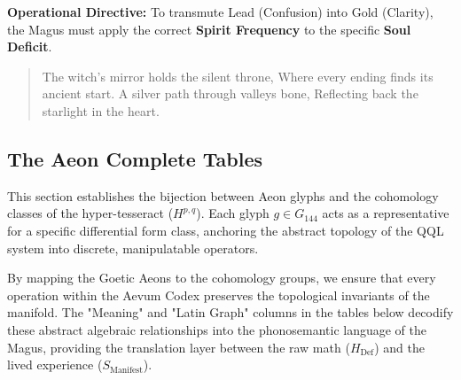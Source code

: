 \documentclass[12pt]{amsart}
\begin{document}
\vspace{1em}
\noindent \textbf{Operational Directive:} To transmute Lead (Confusion) into Gold (Clarity), the Magus must apply the correct \textbf{Spirit Frequency} to the specific \textbf{Soul Deficit}.

\begin{verse}
    The witch's mirror holds the silent throne,
    Where every ending finds its ancient start.
    A silver path through valleys bone,
    Reflecting back the starlight in the heart.
\end{verse}

\newpage
\subsection{The Aeon Complete Tables}\label{sec:15.5}

This section establishes the bijection between Aeon glyphs and the cohomology classes of the hyper-tesseract ($H^{p,q}$). Each glyph $g \in G_{144}$ acts as a representative for a specific differential form class, anchoring the abstract topology of the QQL system into discrete, manipulatable operators.

By mapping the Goetic Aeons to the cohomology groups, we ensure that every operation within the Aevum Codex preserves the topological invariants of the manifold. The "Meaning" and "Latin Graph" columns in the tables below decodify these abstract algebraic relationships into the phonosemantic language of the Magus, providing the translation layer between the raw math ($H_{\text{Def}}$) and the lived experience ($S_{\text{Manifest}}$).
\end{document}
